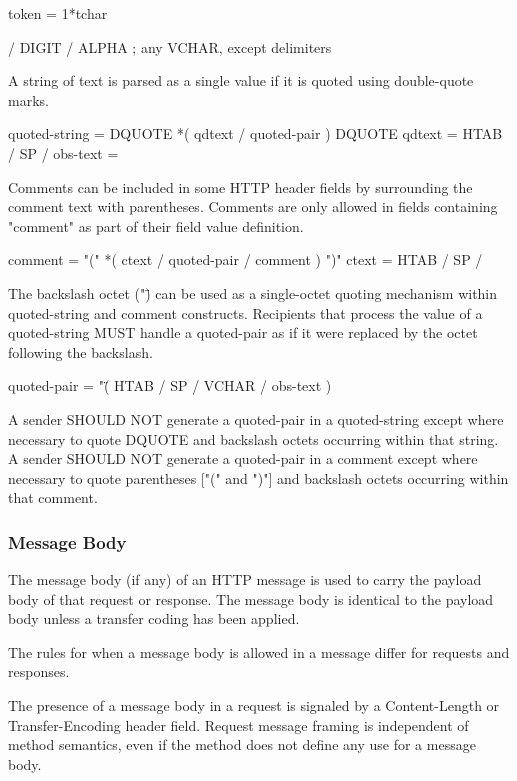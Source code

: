   token          = 1*tchar

                 / DIGIT / ALPHA
                 ; any VCHAR, except delimiters

A string of text is parsed as a single value if it is quoted using
double-quote marks.

  quoted-string  = DQUOTE *( qdtext / quoted-pair ) DQUOTE
  qdtext         = HTAB / SP /%
  obs-text       = %

Comments can be included in some HTTP header fields by surrounding
the comment text with parentheses.  Comments are only allowed in
fields containing "comment" as part of their field value definition.

  comment        = "(" *( ctext / quoted-pair / comment ) ")"
  ctext          = HTAB / SP / %

The backslash octet ("\") can be used as a single-octet quoting
mechanism within quoted-string and comment constructs.  Recipients
that process the value of a quoted-string MUST handle a quoted-pair
as if it were replaced by the octet following the backslash.

  quoted-pair    = "\" ( HTAB / SP / VCHAR / obs-text )

A sender SHOULD NOT generate a quoted-pair in a quoted-string except
where necessary to quote DQUOTE and backslash octets occurring within
that string.  A sender SHOULD NOT generate a quoted-pair in a comment
except where necessary to quote parentheses ["(" and ")"] and
backslash octets occurring within that comment.
\subsubsection*{Message Body }
The message body (if any) of an HTTP message is used to carry the
payload body of that request or response.  The message body is
identical to the payload body unless a transfer coding has been
applied.


The rules for when a message body is allowed in a message differ for
requests and responses.

The presence of a message body in a request is signaled by a
Content-Length or Transfer-Encoding header field.  Request message
framing is independent of method semantics, even if the method does
not define any use for a message body.

